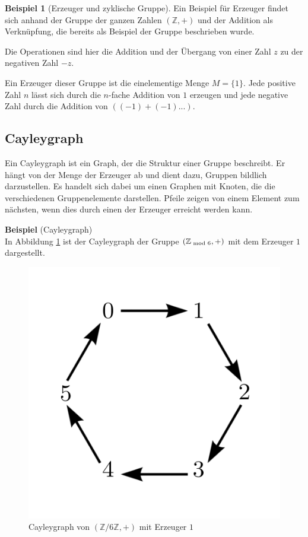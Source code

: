 \documentclass[12pt,a4paper, usenames, dvipsnames]{article}
\theoremstyle{mystyle}
\theoremstyle{definition}
\newtheorem{bsp}{Beispiel}[definition]
\begin{document}
\begin{bsp}[Erzeuger und zyklische Gruppe]

Ein Beispiel für Erzeuger findet sich anhand der Gruppe der ganzen Zahlen $(\mathbb{Z},+)$ und der Addition als Verknüpfung, die bereits als Beispiel der Gruppe beschrieben wurde.

Die Operationen sind hier die Addition und der Übergang von einer Zahl $z$ zu der negativen Zahl $-z$.

Ein Erzeuger dieser Gruppe ist die einelementige Menge $M = \{ 1 \}$. Jede positive Zahl $n$ lässt sich durch die $n$-fache Addition von $1$ erzeugen und jede negative Zahl durch  die Addition von $((-1)+(-1)...)$. 

\end{bsp}
%
%
%
%
%
%
%
%
%
\subsection{Cayleygraph} 
\label{Abschnitt_Cayleygraph}
Ein Cayleygraph ist ein Graph, der die Struktur einer Gruppe beschreibt. Er hängt von der Menge der Erzeuger ab und dient dazu, Gruppen bildlich darzustellen.
Es handelt sich dabei um einen Graphen mit Knoten, die die verschiedenen Gruppenelemente darstellen. Pfeile zeigen von einem Element zum nächsten, wenn dies durch einen der Erzeuger erreicht werden kann. \cite{AT}

\textbf{Beispiel} (Cayleygraph) \\
In Abbildung \ref{Abbildung_Cayleygraph} ist der Cayleygraph der Gruppe $(\mathbb{Z}_{\hspace*{-0.3em}\mod 6}, +)$ mit dem Erzeuger $1$ dargestellt.

\begin{figure}[H]
\centering
\includegraphics[scale=0.7]{Cayleygraph3.png}
\caption{Cayleygraph von $(\mathbb{Z}/6\mathbb{Z}, +)$ mit Erzeuger $1$}
\label{Abbildung_Cayleygraph}
\end{figure}
\end{document}
